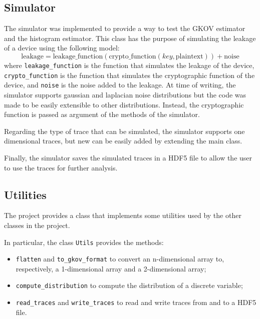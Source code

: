 \documentclass[12pt]{article}
\begin{document}
    \subsection{Simulator}\label{subsec:sim}
    The simulator was implemented to provide a way to test the GKOV estimator and the histogram estimator.
    This class has the purpose of simulating the leakage of a device using the following model:
    \begin{equation}
        \text{leakage} = \text{leakage\_function}(\text{crypto\_function}(key, \text{plaintext})) + \text{noise}\label{eq:sim}
    \end{equation}
    where \texttt{leakage\_function} is the function that simulates the leakage of the device, \texttt{crypto\_function} is the function that simulates the cryptographic function of the device, and \texttt{noise} is the noise added to the leakage.
    At time of writing, the simulator supports gaussian and laplacian noise distributions but the code was made to be easily extensible to other distributions.
    Instead, the cryptographic function is passed as argument of the methods of the simulator.

    Regarding the type of trace that can be simulated, the simulator supports one dimensional traces, but new can be easily added by extending the main class.

    Finally, the simulator saves the simulated traces in a HDF5 file to allow the user to use the traces for further analysis.

    \subsection{Utilities}\label{subsec:utils}
    The project provides a class that implements some utilities used by the other classes in the project.

    In particular, the class \texttt{Utils} provides the methods:
    \begin{itemize}
        \item \texttt{flatten} and \texttt{to\_gkov\_format} to convert an n-dimensional array to, respectively, a 1-dimensional array and a 2-dimensional array;
        \item \texttt{compute\_distribution} to compute the distribution of a discrete variable;
        \item \texttt{read\_traces} and \texttt{write\_traces} to read and write traces from and to a HDF5 file.
    \end{itemize}
\end{document}
